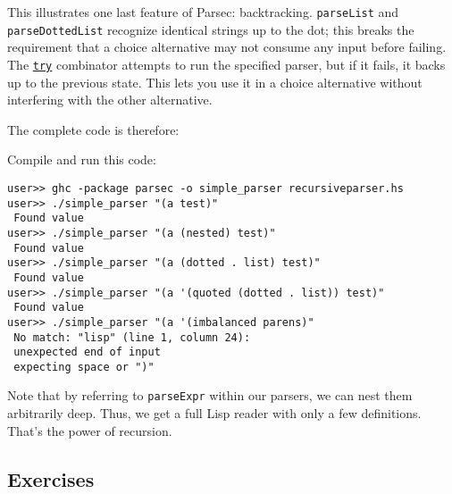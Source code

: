 This illustrates one last feature of Parsec: backtracking. \verb|parseList| and \verb|parseDottedList| recognize identical strings up to the dot; this breaks the requirement that a choice alternative may not consume any input before failing. The \href{http://www.cs.uu.nl/~daan/download/parsec/parsec.html\#try}{\texttt{try}} combinator attempts to run the specified parser, but if it fails, it backs up to the previous state. This lets you use it in a choice alternative without interfering with the other alternative.
 
The complete code is therefore:
 
 
Compile and run this code:
 
\begin{lstlisting}[language=shell,numbers=none,nolol]
user>> ghc -package parsec -o simple_parser recursiveparser.hs
user>> ./simple_parser "(a test)"
 Found value
user>> ./simple_parser "(a (nested) test)"
 Found value
user>> ./simple_parser "(a (dotted . list) test)"
 Found value
user>> ./simple_parser "(a '(quoted (dotted . list)) test)"
 Found value
user>> ./simple_parser "(a '(imbalanced parens)"
 No match: "lisp" (line 1, column 24):
 unexpected end of input
 expecting space or ")"
\end{lstlisting}
 
Note that by referring to \verb|parseExpr| within our parsers, we can nest them arbitrarily deep. Thus, we get a full Lisp reader with only a few definitions. That's the power of recursion.
 
\subsection{Exercises}
 
